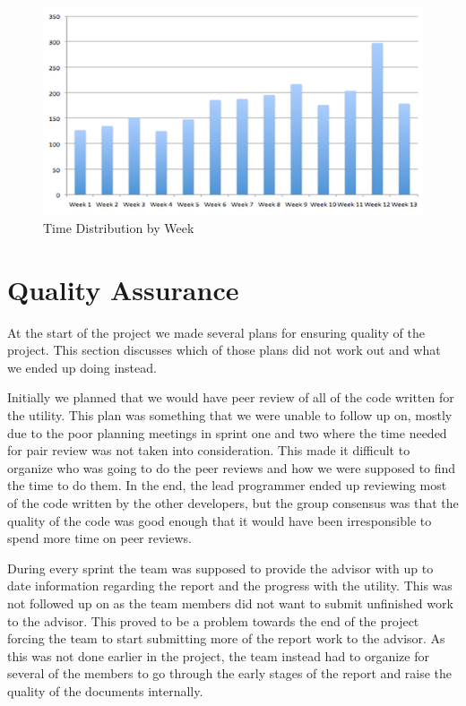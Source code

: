 \begin{figure}[htb]
	\center
	\includegraphics[width=\textwidth]{./evaluation/img/columnchart_effort} 
	\caption{Time Distribution by Week\label{fig:time_by_week}}
\end{figure}

\section{Quality Assurance}
At the start of the project we made several plans for ensuring quality of the project. This section discusses which of those plans did not work out and what we ended up doing instead.

Initially we planned that we would have peer review of all of the code written for the utility. This plan was something that we were unable to follow up on, mostly due to the poor planning meetings in sprint one and two where the time needed for pair review was not taken into consideration. This made it difficult to organize who was going to do the peer reviews and how we were supposed to find the time to do them. In the end, the lead programmer ended up reviewing most of the code written by the other developers, but the group consensus was that the quality of the code was good enough that it would have been irresponsible to spend more time on peer reviews.

During every sprint the team was supposed to provide the advisor with up to date information regarding the report and the progress with the utility. This was not followed up on as the team members did not want to submit unfinished work to the advisor. This proved to be a problem towards the end of the project forcing the team to start submitting more of the report work to the advisor. As this was not done earlier in the project, the team instead had to organize for several of the members to go through the early stages of the report and raise the quality of the documents internally.

